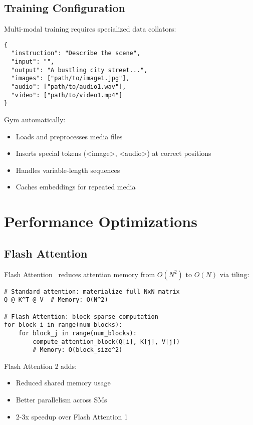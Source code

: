 \documentclass[11pt,letterpaper]{article}
\begin{document}
\subsection{Training Configuration}

Multi-modal training requires specialized data collators:

\begin{verbatim}
{
  "instruction": "Describe the scene",
  "input": "",
  "output": "A bustling city street...",
  "images": ["path/to/image1.jpg"],
  "audio": ["path/to/audio1.wav"],
  "video": ["path/to/video1.mp4"]
}
\end{verbatim}

Gym automatically:
\begin{itemize}
\item Loads and preprocesses media files
\item Inserts special tokens (<image>, <audio>) at correct positions
\item Handles variable-length sequences
\item Caches embeddings for repeated media
\end{itemize}

\section{Performance Optimizations}

\subsection{Flash Attention}

Flash Attention~\citep{dao2023flashattention} reduces attention memory from $O(N^2)$ to $O(N)$ via tiling:

\begin{verbatim}
# Standard attention: materialize full NxN matrix
Q @ K^T @ V  # Memory: O(N^2)

# Flash Attention: block-sparse computation
for block_i in range(num_blocks):
    for block_j in range(num_blocks):
        compute_attention_block(Q[i], K[j], V[j])
        # Memory: O(block_size^2)
\end{verbatim}

Flash Attention 2 adds:
\begin{itemize}
\item Reduced shared memory usage
\item Better parallelism across SMs
\item 2-3x speedup over Flash Attention 1
\end{itemize}
\end{document}
